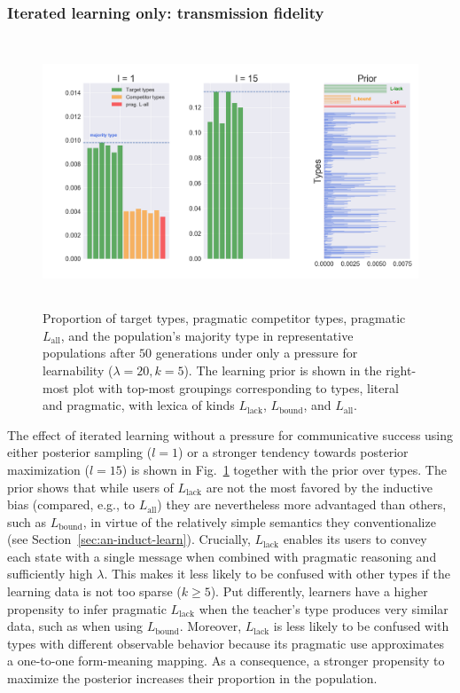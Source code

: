 \documentclass[a4paper, 11pt]{article}
\theoremstyle{Satz}
\newcommand{\mylang}[1]{\ensuremath{L_{\text{#1}}}\xspace} %
\newcommand{\Lall}{\mylang{all}}
\newcommand{\Lbound}{\mylang{bound}}
\newcommand{\Llack}{\mylang{lack}}
\begin{document}
\subsubsection{Iterated learning only: transmission fidelity}

\begin{figure}[t]
\centering
\includegraphics[width=1\textwidth,height=8cm,keepaspectratio]{./plots/alt-fig2-onlym-pr}
\caption{Proportion of target types, pragmatic competitor types, pragmatic $\Lall$, and the population's majority type in representative populations after $50$ generations under only a
  pressure for learnability ($\lambda = 20, k = 5$). The learning prior is shown in the
  right-most plot with top-most groupings corresponding to types, literal and pragmatic, with
  lexica of kinds $\Llack$, $\Lbound$, and $\Lall$.}
\label{fig:only-M}
\end{figure}

The effect of iterated learning without a pressure for communicative success using either posterior
sampling ($l = 1$) or a stronger tendency towards posterior maximization ($l = 15$) is shown in
Fig.~\ref{fig:only-M} together with the prior over types. The prior shows that while users of
$\Llack$ are not the most favored by the inductive bias (compared, e.g., to $\Lall$) they are
nevertheless more advantaged than others, such as $\Lbound$, in virtue of the relatively simple
semantics they conventionalize (see Section~\ref{sec:an-induct-learn}). Crucially, $\Llack$
enables its users to convey each state with a single message when combined with pragmatic
reasoning and sufficiently high $\lambda$. This makes it less likely to be confused with
other types if the learning data is not too sparse ($k \geq 5$). Put differently, learners have
a higher propensity to infer pragmatic $\Llack$ when the teacher's type produces very similar
data, such as when using $\Lbound$. Moreover, $\Llack$ is less likely to be confused with
types with different observable behavior because its pragmatic use approximates a one-to-one
form-meaning mapping. As a consequence, a stronger propensity to maximize the posterior
increases their proportion in the population.
\end{document}

